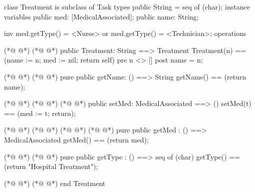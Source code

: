 \begin{vdmpp}[breaklines=true]
class Treatment is subclass of Task
types
 public String = seq of (char);
instance variables
  public med: [MedicalAssociated];
  public name: String;
  
  inv med.getType() = <Nurse> or med.getType() = <Technician>;
operations

(*@
\label{HospitalTreatment:11}
@*)
(*@
\label{HospitalTreatment:11}
@*)
 public Treatment: String ==> Treatment
  Treatment(n) == (name := n; med := nil; return self)
 pre n <> []
 post name = n;
 
(*@
\label{getName:16}
@*)
(*@
\label{getName:16}
@*)
 pure public getName: () ==> String
  getName() == (return name);
  
(*@
\label{setTechnician:19}
@*)
(*@
\label{setTechnician:19}
@*)
(*@
\label{setMed:19}
@*)
 public setMed: MedicalAssociated ==> ()
  setMed(t) == (med := t; return);
 
(*@
\label{getTechnician:22}
@*)
(*@
\label{getTechnician:22}
@*)
(*@
\label{getMed:22}
@*)
(*@
\label{Treatment:22}
@*)
 pure public getMed : () ==> MedicalAssociated
  getMed() == (return med);
 
(*@
\label{getTechnicianName:25}
@*)
(*@
\label{getTechnicianName:25}
@*)
 pure public getType : () ==> seq of (char) 
  getType() == (return "Hospital Treatment");

(*@
\label{getType:28}
@*)
(*@
\label{getType:28}
@*)
end Treatment
\end{vdmpp}
